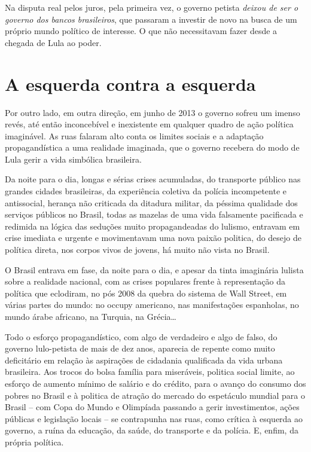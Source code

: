 Na disputa real pelos juros, pela primeira vez, o governo petista
\emph{deixou de ser o governo dos bancos brasileiros}, que passaram a
investir de novo na busca de um próprio mundo político de interesse. O
que não necessitavam fazer desde a chegada de Lula ao poder.

  \section{A esquerda contra a
  esquerda}\label{a-esquerda-contra-a-esquerda}

Por outro lado, em outra direção, em junho de 2013 o governo sofreu um
imenso revés, até então inconcebível e inexistente em qualquer quadro de
ação política imaginável. As ruas falaram alto conta os limites sociais
e a adaptação propagandística a uma realidade imaginada, que o governo
recebera do modo de Lula gerir a vida simbólica brasileira.

Da noite para o dia, longas e sérias crises acumuladas, do transporte
público nas grandes cidades brasileiras, da experiência coletiva da
polícia incompetente e antissocial, herança não criticada da ditadura
militar, da péssima qualidade dos serviços públicos no Brasil, todas as
mazelas de uma vida falsamente pacificada e redimida na lógica das
seduções muito propagandeadas do lulismo, entravam em crise imediata e
urgente e movimentavam uma nova paixão politica, do desejo de política
direta, nos corpos vivos de jovens, há muito não vista no Brasil.

O Brasil entrava em fase, da noite para o dia, e apesar da tinta
imaginária lulista sobre a realidade nacional, com as crises populares
frente à representação da política que eclodiram, no pós 2008 da quebra
do sistema de Wall Street, em várias partes do mundo: no occupy
americano, nas manifestações espanholas, no mundo árabe africano, na
Turquia, na Grécia…

Todo o esforço propagandístico, com algo de verdadeiro e algo de falso,
do governo lulo-petista de mais de dez anos, aparecia de repente como
muito deficitário em relação às aspirações de cidadania qualificada da
vida urbana brasileira. Aos trocos do bolsa família para miseráveis,
politica social limite, ao esforço de aumento mínimo de salário e do
crédito, para o avanço do consumo dos pobres no Brasil e à politica de
atração do mercado do espetáculo mundial para o Brasil -- com Copa do
Mundo e Olimpíada passando a gerir investimentos, ações públicas e
legislação locais -- se contrapunha nas ruas, como crítica à esquerda ao
governo, a ruína da educação, da saúde, do transporte e da polícia. E,
enfim, da própria política.

